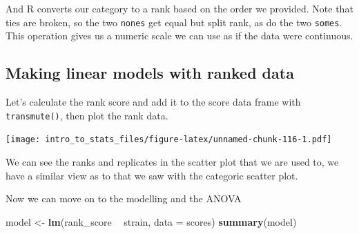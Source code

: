 \documentclass[
]{book}
\newenvironment{Shaded}{\begin{snugshade}}{\end{snugshade}}
\newcommand{\DataTypeTok}[1]{\textcolor[rgb]{0.13,0.29,0.53}{#1}}
\newcommand{\KeywordTok}[1]{\textcolor[rgb]{0.13,0.29,0.53}{\textbf{#1}}}
\newcommand{\NormalTok}[1]{#1}
\newcommand{\OperatorTok}[1]{\textcolor[rgb]{0.81,0.36,0.00}{\textbf{#1}}}
\newcommand{\OtherTok}[1]{\textcolor[rgb]{0.56,0.35,0.01}{#1}}
\newcommand{\StringTok}[1]{\textcolor[rgb]{0.31,0.60,0.02}{#1}}
\begin{document}
And R converts our category to a rank based on the order we provided. Note that ties are broken, so the two \texttt{nones} get equal but split rank, as do the two \texttt{somes}. This operation gives us a numeric scale we can use as if the data were continuous.

\hypertarget{making-linear-models-with-ranked-data}{%
\subsection{Making linear models with ranked data}\label{making-linear-models-with-ranked-data}}

Let's calculate the rank score and add it to the score data frame with \texttt{transmute()}, then plot the rank data.

\begin{Shaded}
\end{Shaded}

\texttt{[image: intro\_to\_stats\_files/figure-latex/unnamed-chunk-116-1.pdf]}

We can see the ranks and replicates in the scatter plot that we are used to, we have a similar view as to that we saw with the categoric scatter plot.

Now we can move on to the modelling and the ANOVA

\begin{Shaded}
\begin{Highlighting}[]
\NormalTok{model <-}\StringTok{ }\KeywordTok{lm}\NormalTok{(rank_score }\OperatorTok{~}\StringTok{ }\NormalTok{strain, }\DataTypeTok{data =}\NormalTok{ scores)}
\KeywordTok{summary}\NormalTok{(model)}
\end{Highlighting}
\end{Shaded}
\end{document}
